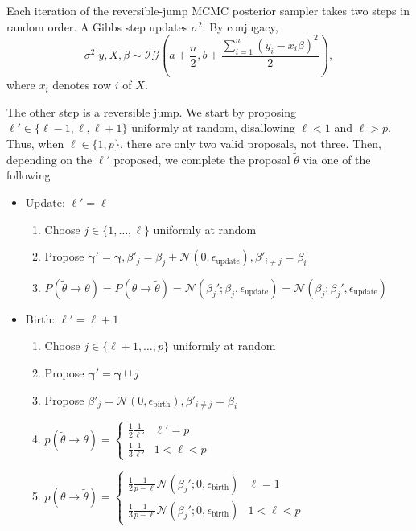 Each iteration of the reversible-jump MCMC posterior sampler takes two steps in random order. A Gibbs step updates $\sigma^{2}$. By conjugacy,
\begin{equation}
    \sigma^{2} | y, X, \beta \sim \mathcal{IG}\left(a + \frac{n}{2}, b + \frac{\sum_{i=1}^{n}(y_{i}-x_{i}\beta)^{2} }{2}\right),
\end{equation}
where $x_{i}$ denotes row $i$ of $X$.

The other step is a reversible jump. We start by proposing $\ell' \in \{\ell-1, \ell, \ell+1\}$ uniformly at random, disallowing $\ell<1$ and $\ell>p$. Thus, when $\ell \in \{1,p\}$, there are only two valid proposals, not three. Then, depending on the $\ell'$ proposed, we complete the proposal $\tilde{\theta}$ via one of the following
\begin{itemize}
    \item Update: $\ell' = \ell$
    \begin{enumerate}
        \item Choose $j \in \{1, \ldots, \ell\}$ uniformly at random
        \item Propose $\mathbf{\gamma}' = \mathbf{\gamma}, \beta'_{j} = \beta_{j} + \mathcal{N}(0, \epsilon_{\text{update}}), \beta'_{i \neq j} = \beta_{i}$
        \item $P(\tilde{\theta} \rightarrow \theta) = P(\theta \rightarrow \tilde{\theta})=\mathcal{N}(\beta_{j}'; \beta_{j},\epsilon_{\text{update}})=\mathcal{N}(\beta_{j}; \beta_{j}',\epsilon_{\text{update}})$
    \end{enumerate}
\end{itemize}

\begin{itemize}
    \item Birth: $\ell' = \ell+1$
    \begin{enumerate}
        \item Choose $j \in \{\ell+1, \ldots, p\}$ uniformly at random
        \item Propose $\mathbf{\gamma}' = \mathbf{\gamma} \cup j$
        \item Propose $\beta'_{j} = \mathcal{N}(0, \epsilon_{\text{birth}}), \beta'_{i \neq j} = \beta_{i}$
        \item $p(\tilde{\theta} \rightarrow \theta) = \begin{cases}\frac{1}{2}\frac{1}{\ell'} & \ell'=p \\ \frac{1}{3} \frac{1}{\ell'} & 1<\ell<p \end{cases} $
        \item $p(\theta \rightarrow \tilde{\theta}) = \begin{cases}\frac{1}{2}\frac{1}{p-\ell} \mathcal{N}(\beta_{j}'; 0,\epsilon_{\text{birth}}) & \ell=1 \\ \frac{1}{3} \frac{1}{p-\ell} \mathcal{N}(\beta_{j}'; 0,\epsilon_{\text{birth}}) & 1<\ell<p \end{cases} $
    \end{enumerate}
\end{itemize}

